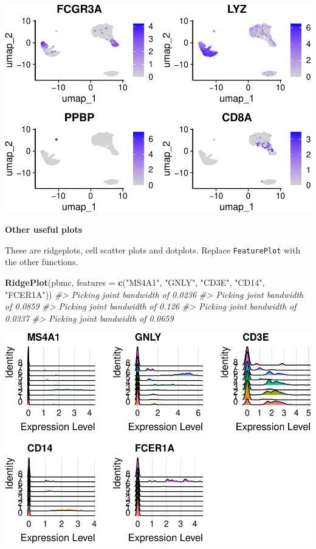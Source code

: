 \documentclass[
]{book}
\newenvironment{Shaded}{\begin{snugshade}}{\end{snugshade}}
\newcommand{\AttributeTok}[1]{\textcolor[rgb]{0.13,0.29,0.53}{#1}}
\newcommand{\CommentTok}[1]{\textcolor[rgb]{0.56,0.35,0.01}{\textit{#1}}}
\newcommand{\FunctionTok}[1]{\textcolor[rgb]{0.13,0.29,0.53}{\textbf{#1}}}
\newcommand{\NormalTok}[1]{#1}
\newcommand{\StringTok}[1]{\textcolor[rgb]{0.31,0.60,0.02}{#1}}
\begin{document}
\includegraphics{scRNAseqInR_Doco_files/figure-latex/markerplots-2.pdf}

\textbf{Other useful plots}

These are ridgeplots, cell scatter plots and dotplots. Replace \texttt{FeaturePlot} with the other functions.

\begin{Shaded}
\begin{Highlighting}[]
\FunctionTok{RidgePlot}\NormalTok{(pbmc, }\AttributeTok{features =} \FunctionTok{c}\NormalTok{(}\StringTok{"MS4A1"}\NormalTok{, }\StringTok{"GNLY"}\NormalTok{, }\StringTok{"CD3E"}\NormalTok{, }\StringTok{"CD14"}\NormalTok{, }\StringTok{"FCER1A"}\NormalTok{))}
\CommentTok{\#\textgreater{} Picking joint bandwidth of 0.0236}
\CommentTok{\#\textgreater{} Picking joint bandwidth of 0.0859}
\CommentTok{\#\textgreater{} Picking joint bandwidth of 0.126}
\CommentTok{\#\textgreater{} Picking joint bandwidth of 0.0337}
\CommentTok{\#\textgreater{} Picking joint bandwidth of 0.0659}
\end{Highlighting}
\end{Shaded}

\includegraphics{scRNAseqInR_Doco_files/figure-latex/ridgeplots-1.pdf}
\end{document}
